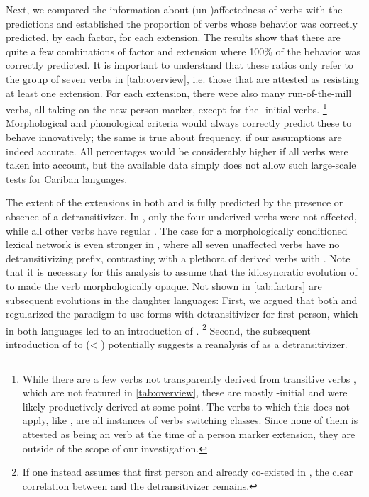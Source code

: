 Next, we compared the information about (un-)affectedness of verbs  with the predictions and established the proportion of verbs whose behavior was correctly predicted, by each factor, for each extension.
The results  show that there are quite a few combinations of factor and extension where 100\% of the behavior was correctly predicted.
It is important to understand that these ratios only refer to the group of seven verbs in \cref{tab:overview}, i.e. those that are attested as resisting at least one extension.
For each extension, there were also many run-of-the-mill  verbs, all taking on the new person marker, except for the \akuriyo {}-initial verbs.%
\footnote{While there are a few  verbs not transparently derived from transitive verbs \parencites[252]{triomeira1999}[222]{meira2000split}[30]{gildea2007greenberg}, which are not featured in \cref{tab:overview}, these are mostly -initial and were likely productively derived at some point.
The verbs to which this does not apply, like \trio {}  \parencites[252]{triomeira1999}, are all instances of  verbs switching classes.
Since none of them is attested as being an  verb at the time of a person marker extension, they are outside of the scope of our investigation.}
Morphological and phonological criteria would always correctly predict these to behave innovatively; the same is true about frequency, if our assumptions are indeed accurate.
All percentages would be considerably higher if all verbs were taken into account, but the available data simply does not allow such large-scale tests for Cariban languages.




The extent of the extensions in both \PWai and \PPek is fully predicted by the presence or absence of a detransitivizer.
In \PWai, only the four underived  verbs were not affected, while all other  verbs have regular .
The case for a morphologically conditioned lexical network is even stronger in \PPek, where all seven unaffected verbs have no detransitivizing prefix, contrasting with a plethora of derived  verbs with .
Note that it is necessary for this analysis to assume that the idiosyncratic evolution of   to   made the verb morphologically opaque.
Not shown in \cref{tab:factors} are subsequent evolutions in the daughter languages:
First, we argued that both \ikpeng and \bakairi regularized the paradigm to use forms with detransitivizer for first person, which in both languages led to an introduction of .%
\footnote{If one instead assumes that first person  and  already co-existed in \PPek, the clear correlation between  and the detransitivizer remains.}
Second, the subsequent introduction of  to \ikpeng {}  (< ) potentially suggests a reanalysis of  as a detransitivizer.

